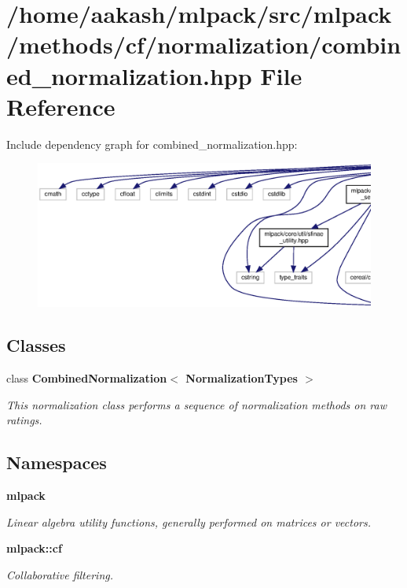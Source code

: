 \section{/home/aakash/mlpack/src/mlpack/methods/cf/normalization/combined\+\_\+normalization.hpp File Reference}
\label{combined__normalization_8hpp}
Include dependency graph for combined\+\_\+normalization.\+hpp\+:
\nopagebreak
\begin{figure}[H]
\begin{center}
\leavevmode
\includegraphics[width=350pt]{combined__normalization_8hpp__incl}
\end{center}
\end{figure}
\subsection*{Classes}
\begin{DoxyCompactItemize}
\item 
class \textbf{ Combined\+Normalization$<$ Normalization\+Types $>$}
\begin{DoxyCompactList}\small\item\em This normalization class performs a sequence of normalization methods on raw ratings. \end{DoxyCompactList}\end{DoxyCompactItemize}
\subsection*{Namespaces}
\begin{DoxyCompactItemize}
\item 
 \textbf{ mlpack}
\begin{DoxyCompactList}\small\item\em Linear algebra utility functions, generally performed on matrices or vectors. \end{DoxyCompactList}\item 
 \textbf{ mlpack\+::cf}
\begin{DoxyCompactList}\small\item\em Collaborative filtering. \end{DoxyCompactList}\end{DoxyCompactItemize}


